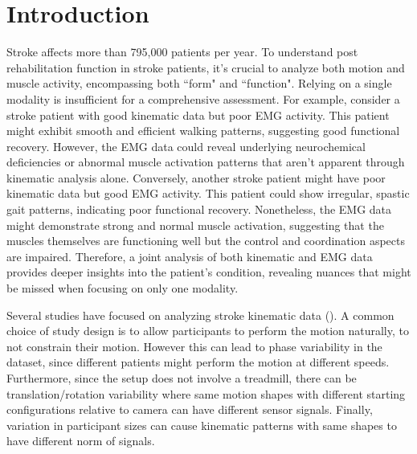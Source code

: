 \documentclass{article}
\newcommand{\shashwat}[1]{\textcolor{blue}{shashwat: #1 \\}}
\begin{document}
\section{Introduction}
Stroke affects more than 795,000 patients per year. To understand post rehabilitation function in stroke patients, it's crucial to analyze both motion and muscle activity, encompassing both ``form" and ``function". Relying on a single modality is insufficient for a comprehensive assessment. For example, consider a stroke patient with good kinematic data but poor EMG activity. This patient might exhibit smooth and efficient walking patterns, suggesting good functional recovery. However, the EMG data could reveal underlying neurochemical deficiencies or abnormal muscle activation patterns that aren't apparent through kinematic analysis alone. Conversely, another stroke patient might have poor kinematic data but good EMG activity. This patient could show irregular, spastic gait patterns, indicating poor functional recovery. Nonetheless, the EMG data might demonstrate strong and normal muscle activation, suggesting that the muscles themselves are functioning well but the control and coordination aspects are impaired. Therefore, a joint analysis of both kinematic and EMG data provides deeper insights into the patient's condition, revealing nuances that might be missed when focusing on only one modality.



Several studies have focused on analyzing stroke kinematic data (\cite{van2023full}). A common choice of study design is to allow participants to perform the motion naturally, to not constrain their motion. However this can lead to phase variability in the dataset, since different patients might perform the motion at different speeds. Furthermore, since the setup does not involve a treadmill, there can be translation/rotation variability where same motion shapes with different starting configurations relative to camera can have different sensor signals. Finally, variation in participant sizes can cause kinematic patterns with same shapes to have different norm of signals. 
\end{document}
